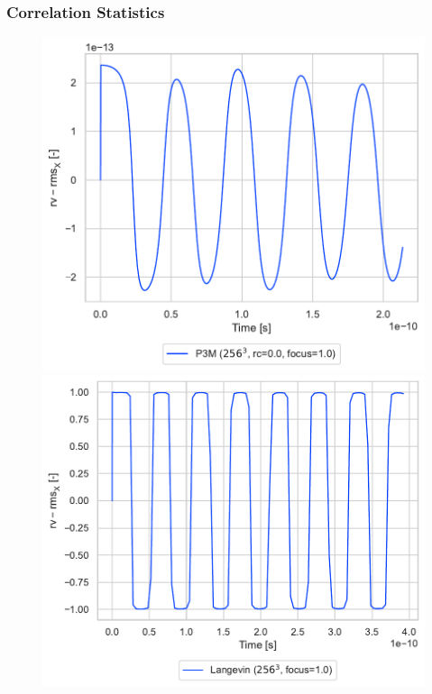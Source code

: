 \documentclass[.08pt,aspectratio=169]{beamer}
\begin{document}
\begin{frame}
    \frametitle{Correlation Statistics}

\begin{figure}[!htb]
  \includegraphics[width=1.1\linewidth]{figures/rvrmsX_p3m.pdf}
  \label{fig:awesome_image2}
\endminipage\hfill
{}%
  \includegraphics[width=1.1\linewidth]{figures/rvrmsX_langevin.pdf}
  \label{fig:awesome_image3}
\endminipage
\end{figure}

\end{frame}
\end{document}

